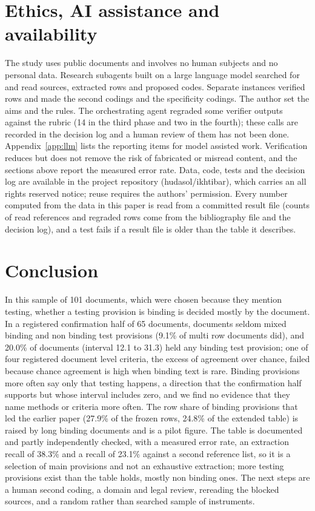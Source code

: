 \documentclass[conference]{IEEEtran}
\begin{document}
\section{Ethics, AI assistance and availability}\label{sec:ethics}
The study uses public documents and involves no human subjects and no personal data. Research subagents built on a large language model searched for and read sources, extracted rows and proposed codes. Separate instances verified rows and made the second codings and the specificity codings. The author set the aims and the rules. The orchestrating agent regraded some verifier outputs against the rubric (14 in the third phase and two in the fourth); these calls are recorded in the decision log and a human review of them has not been done. Appendix~\ref{app:llm} lists the reporting items for model assisted work. Verification reduces but does not remove the risk of fabricated or misread content, and the sections above report the measured error rate. Data, code, tests and the decision log are available in the project repository (hudasol/ikhtibar), which carries an all rights reserved notice; reuse requires the authors' permission. Every number computed from the data in this paper is read from a committed result file (counts of read references and regraded rows come from the bibliography file and the decision log), and a test fails if a result file is older than the table it describes.

\section{Conclusion}
In this sample of 101 documents, which were chosen because they mention testing, whether a testing provision is binding is decided mostly by the document. In a registered confirmation half of 65 documents, documents seldom mixed binding and non binding test provisions (9.1\% of multi row documents did), and 20.0\% of documents (interval 12.1 to 31.3) held any binding test provision; one of four registered document level criteria, the excess of agreement over chance, failed because chance agreement is high when binding text is rare. Binding provisions more often say only that testing happens, a direction that the confirmation half supports but whose interval includes zero, and we find no evidence that they name methods or criteria more often. The row share of binding provisions that led the earlier paper (27.9\% of the frozen rows, 24.8\% of the extended table) is raised by long binding documents and is a pilot figure. The table is documented and partly independently checked, with a measured error rate, an extraction recall of 38.3\% and a recall of 23.1\% against a second reference list, so it is a selection of main provisions and not an exhaustive extraction; more testing provisions exist than the table holds, mostly non binding ones. The next steps are a human second coding, a domain and legal review, rereading the blocked sources, and a random rather than searched sample of instruments.
\end{document}
